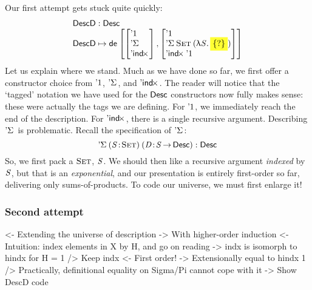 Our first attempt gets stuck quite quickly:
%
\[\stk{
\DescD : \Desc \\
\DescD \mapsto
  \tada{\stkm{\DUnit\\ \DSigma{\!}{\!}\\ \DIndx{\!}}}
       {\stkm{ \DUnit                                \\
         \DSigma{\Set}{(\LAM{\V{S}} \SHED)}      \\
         \DIndx{\DUnit}    }                    } \\
}\]
%
Let us explain where we stand. Much as
we have done so far, we first offer a constructor choice from
$\DUnit$, $\DSigma{\!}{\!}$, and $\DIndx{\!}$. The reader will notice
that the `tagged' notation we have used for the $\Desc$ constructors now
fully makes sense: these were actually the tags we are defining.
For $\DUnit$, we immediately reach the end of the description. For
$\DIndx{\!}$, there is a single recursive argument. Describing
$\DSigma{\!}{\!}$ is problematic. Recall the specification of
$\DSigma{\!}{\!}$:
%
\[
\DSigma{(\Bhab{\V{S}}{\Set})}{(\Bhab{\V{D}}{\V{S} \To \Desc})} : \Desc\\
\]
%
So, we first pack a  $\Set$, $\V{S}$. We should then like
a recursive argument \emph{indexed} by $\V{S}$, but
that is an \emph{exponential}, and our presentation is entirely
first-order so far, delivering only sums-of-products. To code our
universe, we must first enlarge it!


\subsubsection{Second attempt}

\begin{wstructure}
<- Extending the universe of description
    -> With higher-order induction
    <- Intuition: index elements in X by H, and go on reading
        -> indx is isomorph to hindx for H = 1
    /> Keep indx
        <- First order!
        -> Extensionally equal to hindx 1
        /> Practically, definitional equality on Sigma/Pi cannot cope with it
    -> Show DescD code
\end{wstructure}

